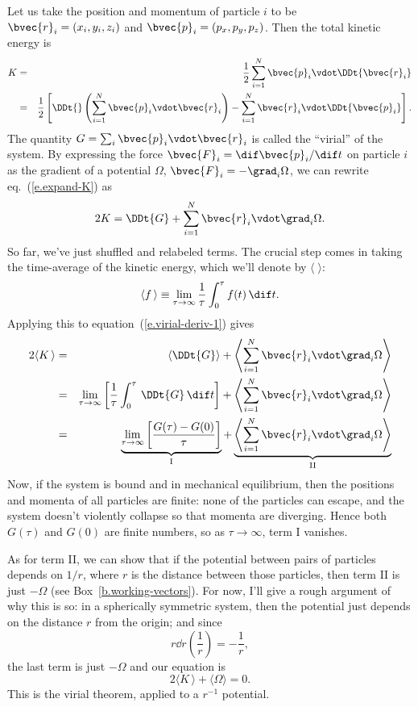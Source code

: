 Let us take the position and momentum of particle $i$ to be $\bvec{r}_{i} = (x_{i},y_{i},z_{i})$ and $\bvec{p}_{i}=(p_{x},p_{y},p_{z})$.  Then the total kinetic energy is
\begin{eqnarray}
\nonumber
	K &=& \frac{1}{2}\sum_{i=1}^{N}\bvec{p}_{i}\vdot\DDt{\bvec{r}_{i}}\\
		&=& \frac{1}{2}\left[\DDt{}\left(\sum_{i=1}^{N}\bvec{p}_{i}\vdot\bvec{r}_{i}\right) - \sum_{i=1}^{N}\bvec{r}_{i}\vdot\DDt{\bvec{p}_{i}}\right].
\label{e.expand-K}
\end{eqnarray}
The quantity $G = \sum_{i}\bvec{p}_{i}\vdot\bvec{r}_{i}$ is called the ``virial'' of the system.  By expressing the force $\bvec{F}_{i} = \dif\bvec{p}_{i}/\dif t$ on particle $i$ as the gradient of a potential $\Omega$, $\bvec{F}_{i} = -\grad_{i}\Omega$, we can rewrite eq.~(\ref{e.expand-K}) as
\begin{equation}\label{e.virial-deriv-1}
	2K = \DDt{G} + \sum_{i=1}^{N}\bvec{r}_{i}\vdot\grad_{i}\Omega.
\end{equation}
So far, we've just shuffled and relabeled terms.  The crucial step comes in taking the time-average of the kinetic energy, which we'll denote by $\langle\;\rangle$:
\[	\langle f\,\rangle \equiv \lim_{\tau\to\infty} \frac{1}{\tau}\int_{0}^{\tau}f(t)\,\dif t. \]
Applying this to equation~(\ref{e.virial-deriv-1}) gives
\begin{eqnarray*}
	2\langle K\,\rangle &=&
		 \left\langle\DDt{G}\right\rangle 
		+ \left\langle\sum_{i=1}^{N}\bvec{r}_{i}\vdot\grad_{i}\Omega\right\rangle\\
	&=& \lim_{\tau\to\infty}\left[\frac{1}{\tau}\int_{0}^{\tau}\,\DDt{G}\,\dif t\right] 
		+ \left\langle\sum_{i=1}^{N}\bvec{r}_{i}\vdot\grad_{i}\Omega\right\rangle\\
	&=& \underbrace{\lim_{\tau\to\infty}\left[\frac{G(\tau)-G(0)}{\tau}\right]}_{\mathrm{I}}
		+ \underbrace{\left\langle\sum_{i=1}^{N}\bvec{r}_{i}\vdot\grad_{i}\Omega\right\rangle}_{\mathrm{II}}
\end{eqnarray*}
Now, if the system is bound and in mechanical equilibrium, then the positions and momenta of all particles are finite: none of the particles can escape, and the system doesn't violently collapse so that momenta are diverging.  Hence both $G(\tau)$ and $G(0)$ are finite numbers, so as $\tau\to\infty$, term I vanishes.

As for term II, we can show that if the potential between pairs of particles depends on $1/r$, where $r$ is the distance between those particles, then term II is just $-\Omega$ (see Box~\ref{b.working-vectors}).  For now, I'll give a rough argument of why this is so:  in a spherically symmetric system, then the potential just depends on the distance $r$ from the origin; and since
\[
	r\dd{}{r} \left(\frac{1}{r}\right) = -\frac{1}{r},
\]
the last term is just $-\Omega$ and our equation is
\begin{equation}\label{e.virial-theorem}
2\langle K\,\rangle + \langle \Omega\rangle = 0.
\end{equation}
This is the virial theorem, applied to a $r^{-1}$ potential.

